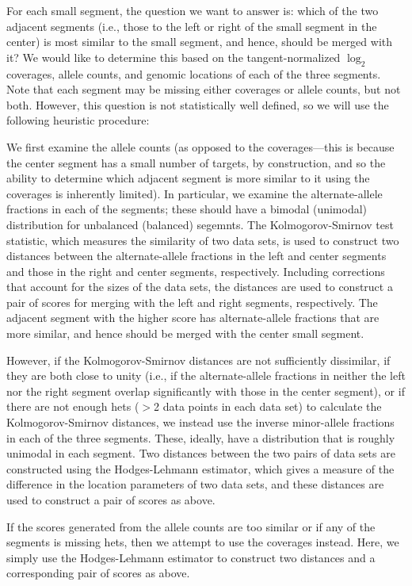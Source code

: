 \documentclass[nofootinbib,amssymb,amsmath]{revtex4}
\begin{document}
For each small segment, the question we want to answer is: which of the two adjacent segments (i.e., those to the left or right of the small segment in the center) is most similar to the small segment, and hence, should be merged with it?  We would like to determine this based on the tangent-normalized $\log_2$ coverages, allele counts, and genomic locations of each of the three segments.  Note that each segment may be missing either coverages or allele counts, but not both.  However, this question is not statistically well defined, so we will use the following heuristic procedure:

We first examine the allele counts (as opposed to the coverages---this is because the center segment has a small number of targets, by construction, and so the ability to determine which adjacent segment is more similar to it using the coverages is inherently limited).  In particular, we examine the alternate-allele fractions in each of the segments; these should have a bimodal (unimodal) distribution for unbalanced (balanced) segemnts.  The Kolmogorov-Smirnov test statistic, which measures the similarity of two data sets, is used to construct two distances between the alternate-allele fractions in the left and center segments and those in the right and center segments, respectively.  Including corrections that account for the sizes of the data sets, the distances are used to construct a pair of scores for merging with the left and right segments, respectively.  The adjacent segment with the higher score has alternate-allele fractions that are more similar, and hence should be merged with the center small segment.

However, if the Kolmogorov-Smirnov distances are not sufficiently dissimilar, if they are both close to unity (i.e., if the alternate-allele fractions in neither the left nor the right segment overlap significantly with those in the center segment), or if there are not enough hets ($>$2 data points in each data set) to calculate the Kolmogorov-Smirnov distances, we instead use the inverse minor-allele fractions in each of the three segments.   These, ideally, have a distribution that is roughly unimodal in each segment.  Two distances between the two pairs of data sets are constructed using the Hodges-Lehmann estimator, which gives a measure of the difference in the location parameters of two data sets, and these distances are used to construct a pair of scores as above.

 If the scores generated from the allele counts are too similar or if any of the segments is missing hets, then we attempt to use the coverages instead.  Here, we simply use the Hodges-Lehmann estimator to construct two distances and a corresponding pair of scores as above.
\end{document}
